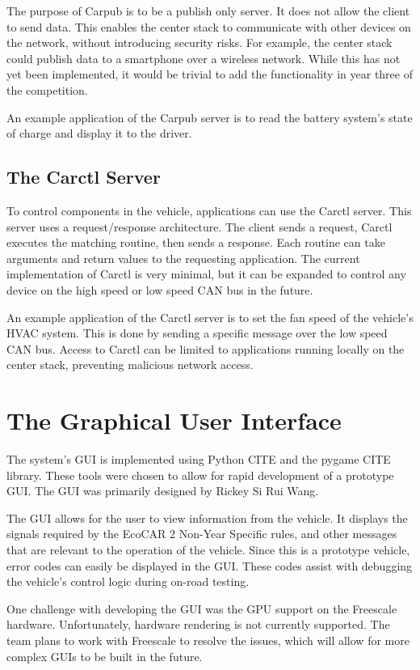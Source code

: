\documentclass[ece]{uw-wkrpt}
\begin{document}
The purpose of Carpub is to be a publish only server. It does not allow the
client to send data. This enables the center stack to communicate with other
devices on the network, without introducing security risks. For example, the
center stack could publish data to a smartphone over a wireless network. While
this has not yet been implemented, it would be trivial to add the functionality
in year three of the competition.

An example application of the Carpub server is to read the battery system's
state of charge and display it to the driver.

\subsection{The Carctl Server}

To control components in the vehicle, applications can use the Carctl server.
This server uses a request/response architecture. The client sends a request,
Carctl executes the matching routine, then sends a response. Each routine can
take arguments and return values to the requesting application. The current
implementation of Carctl is very minimal, but it can be expanded to control any
device on the high speed or low speed CAN bus in the future.

An example application of the Carctl server is to set the fan speed of the
vehicle's HVAC system. This is done by sending a specific message over the low
speed CAN bus. Access to Carctl can be limited to applications running locally
on the center stack, preventing malicious network access.

\section{The Graphical User Interface}

The system's GUI is implemented using Python CITE and the pygame CITE library.
These tools were chosen to allow for rapid development of a prototype GUI. The
GUI was primarily designed by Rickey Si Rui Wang.

The GUI allows for the user to view information from the vehicle. It displays
the signals required by the EcoCAR 2 Non-Year Specific rules, and other messages
that are relevant to the operation of the vehicle. Since this is a prototype
vehicle, error codes can easily be displayed in the GUI. These codes assist with
debugging the vehicle's control logic during on-road testing.

One challenge with developing the GUI was the GPU support on the Freescale
hardware. Unfortunately, hardware rendering is not currently supported. The team
plans to work with Freescale to resolve the issues, which will allow for more
complex GUIs to be built in the future.
\end{document}
